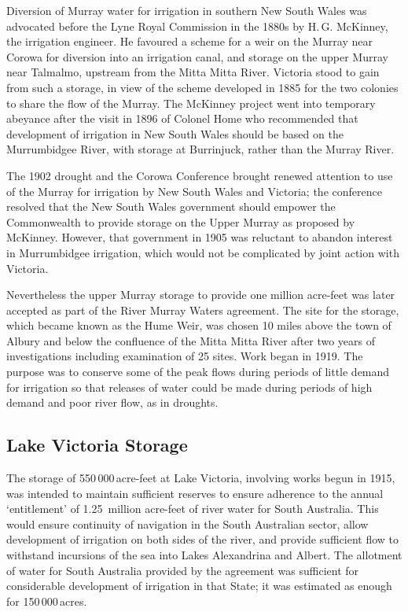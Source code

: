 Diversion of Murray water for irrigation in southern New South Wales
was advocated before the Lyne Royal Commission in the 1880s by
H.\,G. McKinney,  the irrigation engineer.  He
favoured a scheme for a weir on the Murray  near
Corowa  for diversion into an irrigation canal, and
storage on the upper Murray near Talmalmo, 
upstream from the Mitta Mitta River. 
Victoria stood to gain from such a storage, in view of the scheme
developed in 1885 for the two colonies to share the flow of the
Murray.  The McKinney project went into temporary abeyance after the
visit in 1896 of Colonel Home who recommended that development of
irrigation in New South Wales should be based on the Murrumbidgee
River,  with storage at Burrinjuck,
 rather than the Murray
River.

The 1902 drought and the Corowa Conference brought renewed attention
to use of the Murray for irrigation by New South Wales and Victoria;
the conference resolved that the New South Wales government should
empower the Commonwealth to provide storage on the Upper Murray as
proposed by McKinney.  However, that government in 1905 was reluctant
to abandon interest in Murrumbidgee irrigation, which would not be
complicated by joint action with
Victoria.

Nevertheless the upper Murray storage to provide one million acre-feet
was later accepted as part of the River Murray Waters agreement. The
site for the storage, which became known as the Hume Weir,
 was chosen 10 miles above the town of Albury
 and below the confluence of the Mitta Mitta River
after two years of investigations including examination of 25 sites.
Work began in 1919.  The purpose was to conserve some of the peak
flows during periods of little demand for irrigation so that releases
of water could be made during periods of high demand and poor river
flow, as in droughts.

\subsection*{Lake Victoria Storage}

The storage of 550\,000\,acre-feet at Lake Victoria, involving works
begun in 1915, was intended to maintain sufficient reserves to ensure
adherence to the annual `entitlement' of 1.25~million acre-feet of
river water for South Australia.  This would ensure continuity of
navigation in the South Australian sector, allow development of
irrigation on both sides of the river, and provide sufficient flow to
withstand incursions of the sea into Lakes Alexandrina and
Albert.  The allotment of
water for South Australia provided by the agreement was sufficient for
considerable development of irrigation in that State; it was estimated
as enough for 150\,000\,acres.

